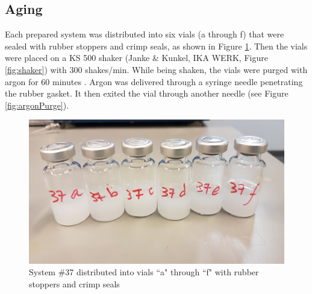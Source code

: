 \subsection{Aging}
Each prepared system was distributed into six vials (a through f) that were sealed with rubber stoppers and crimp seals, as shown in Figure \ref{fig:vials}. Then the vials were placed on a KS 500 shaker (Janke \& Kunkel, IKA WERK, Figure \ref{fig:shaker}) with 300 shakes/min. While being shaken, the vials were purged with argon for 60 minutes \why. Argon was delivered through a syringe needle penetrating the rubber gasket. It then exited the vial through another needle (see Figure \ref{fig:argonPurge}).
\begin{figure}[p]
    \centering
    \includegraphics[width=.7\textwidth]{img/fig/vials.jpg}
    \caption{System \#37 distributed into vials ``a" through ``f" with rubber stoppers and crimp seals}
    \label{fig:vials}
\end{figure}
